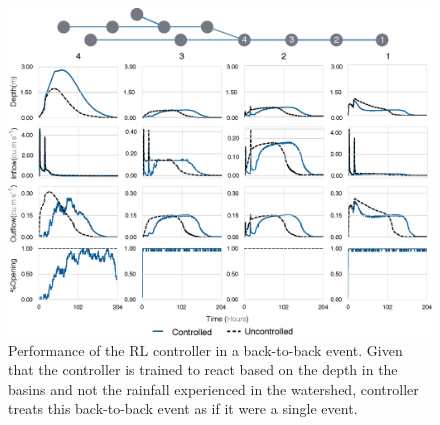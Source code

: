 \begin{figure}[H]
    \centering
    \includegraphics[width=\linewidth]{gfx/Chapter-3/b2b.eps}
    \caption{Performance of the RL controller in a back-to-back event. Given that the controller is trained to react based on the depth in the basins and not the rainfall experienced in the watershed, controller treats this back-to-back event as if it were a single event.}\label{fig:10}
\end{figure}

